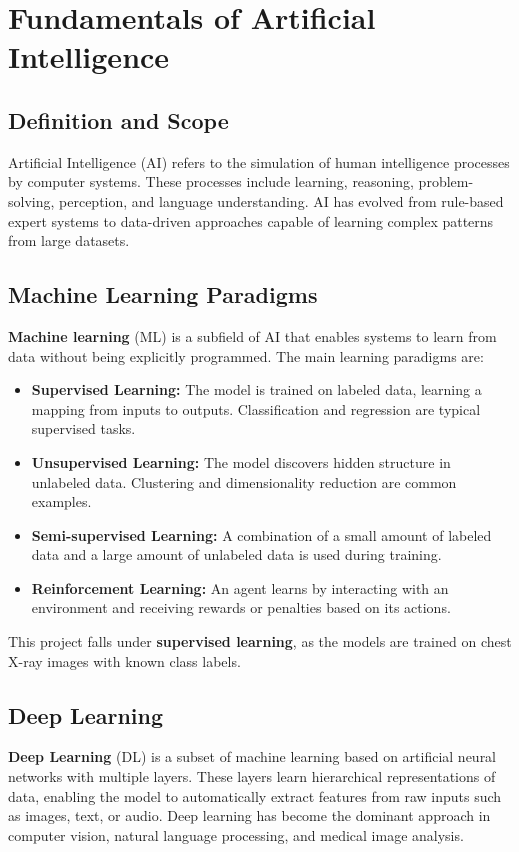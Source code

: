 \documentclass[12pt]{report}
\begin{document}
\section{Fundamentals of Artificial Intelligence}

\subsection{Definition and Scope}
Artificial Intelligence (AI) refers to the simulation of human intelligence
processes by computer systems. These processes include learning, reasoning,
problem-solving, perception, and language understanding. AI has evolved
from rule-based expert systems to data-driven approaches capable of learning
complex patterns from large datasets.

\subsection{Machine Learning Paradigms}
\textbf{Machine learning} (ML) is a subfield of AI that enables systems to learn
from data without being explicitly programmed. The main learning paradigms
are:

\begin{itemize}
    \item \textbf{Supervised Learning:} The model is trained on labeled
    data, learning a mapping from inputs to outputs. Classification and
    regression are typical supervised tasks.

    \item \textbf{Unsupervised Learning:} The model discovers hidden
    structure in unlabeled data. Clustering and dimensionality reduction
    are common examples.

    \item \textbf{Semi-supervised Learning:} A combination of a small
    amount of labeled data and a large amount of unlabeled data is used
    during training.

    \item \textbf{Reinforcement Learning:} An agent learns by interacting
    with an environment and receiving rewards or penalties based on its
    actions.
\end{itemize}

This project falls under \textbf{supervised learning}, as the models are
trained on chest X-ray images with known class labels.

\subsection{Deep Learning}
\textbf{Deep Learning} (DL) is a subset of machine learning based on artificial
neural networks with multiple layers. These layers learn hierarchical
representations of data, enabling the model to automatically extract
features from raw inputs such as images, text, or audio. Deep learning
has become the dominant approach in computer vision, natural language
processing, and medical image analysis.
\end{document}

